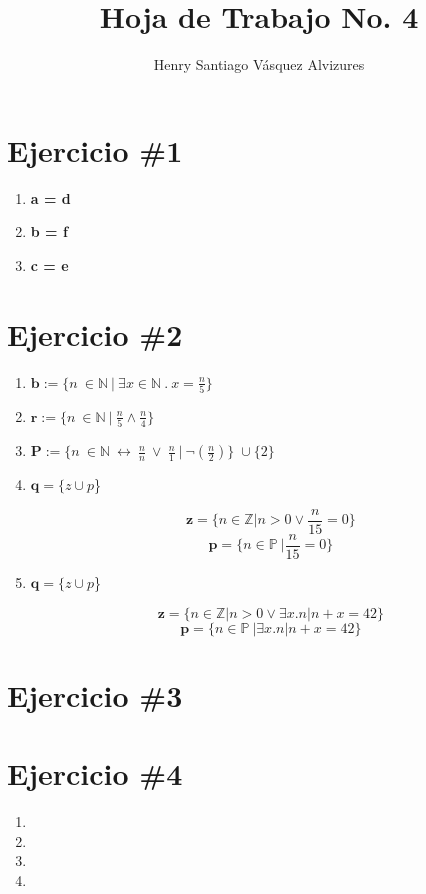 \documentclass[12pt,letterpaper]{article}
\author{Henry Santiago Vásquez Alvizures}
\title{Hoja de Trabajo No. 4}
\begin{document}
\maketitle 
\section{Ejercicio \#1}
	\begin{enumerate}
		\item {
			\textbf{a = d}		
		}
		\item {
			\textbf{b = f}
		}
		\item {
			\textbf{c = e}		
		}		
	\end{enumerate}
\section{Ejercicio \#2}
	\begin{enumerate}
		\item{
			$\textbf{b}:=\{n\ \in \mathbb{N}\ |\ \exists x \in \mathbb{N}\ .\ x=\frac{n}{5}\}$
			}
		\item{
			$\textbf{r}:=\{n\ \in \mathbb{N}\ |\ \frac{n}{5} \wedge \frac{n}{4}\}$
		}
		\item{
		  $\textbf{P}:=\{n\ \in \mathbb{N}\ \leftrightarrow\ \frac{n}{n}\ \lor\   \frac{n}{1}\ |\ \neg (\frac{n}{2})\}$\ $\cup\  \{2\}$
		}
		\item{
		 {$\textbf{q}=\{ z \cup p $\}}
		 
		 \[\textbf{z}=\{n \in \mathbb{Z} | n > 0 \lor \frac{n}{15} = 0 \}\]
		 \[\textbf{p}=\{n \in \mathbb{P}\ | \frac{n}{15} = 0 \}\]
		}
		\item{
			{$\textbf{q}=\{ z \cup p $\}}
		 
		 \[\textbf{z}=\{n \in \mathbb{Z} | n > 0 \lor \exists x. n | n + x = 42 \}\]
		 \[\textbf{p}=\{n \in \mathbb{P}\ | \exists x.n | n + x = 42\}\]
		}
	\end{enumerate}
\section{Ejercicio \#3}
	\begin{flushleft}
		\textbf{}
	\end{flushleft}
\section{Ejercicio \#4}
	\begin{enumerate}
		\item{
			
		}
		\item{
		
		}
		\item{
		
		}
		\item{
		
		}
	\end{enumerate}
\end{document}
